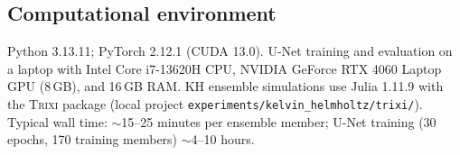 
\subsection{Computational environment}

Python 3.13.11; PyTorch 2.12.1 (CUDA 13.0).
U-Net training and evaluation on a laptop with Intel Core i7-13620H CPU, NVIDIA GeForce RTX 4060 Laptop GPU (8\,GB), and 16\,GB RAM.
KH ensemble simulations use Julia 1.11.9 with the \textsc{Trixi} package (local project \texttt{experiments/kelvin\_helmholtz/trixi/}).
Typical wall time: $\sim$15--25 minutes per ensemble member; U-Net training (30 epochs, 170 training members) $\sim$4--10 hours.
